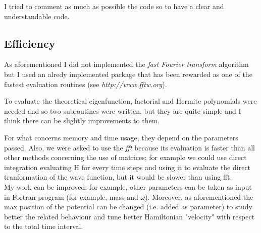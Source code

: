 \documentclass[12pt, a4paper, notitlepage]{report}
\begin{document}
I tried to comment as much as possible the code so to have a clear and understandable code.

\subsection*{Efficiency}

As aforementioned I did not implemented the \textit{fast Fourier transform} algorithm but I used an alredy implemented package that has been rewarded as one of the fastest evaluation routines (see \textit{http://www.fftw.org}).

To evaluate the theoretical eigenfunction, factorial and Hermite polynomials were needed and so two subroutines were written, but they are quite simple and I think there can be slightly improvements to them.

For what concerns memory and time usage, they depend on the parameters passed. Also, we were asked to use the \textit{fft} because its evaluation is faster than all other methods concerning the use of matrices; for example we could use direct integration evaluating H for every time steps and using it to evaluate the direct tranformation of the wave function, but it would be slower than using fft. \\

My work can be improved: for example, other parameters can be taken as input in Fortran program (for example, mass and $\omega$). Moreover, as aforementioned the max position of the potential can be changed (i.e. added as parameter) to study better the related behaviour and tune better Hamiltonian "velocity" with respect to the total time interval.
\end{document}
